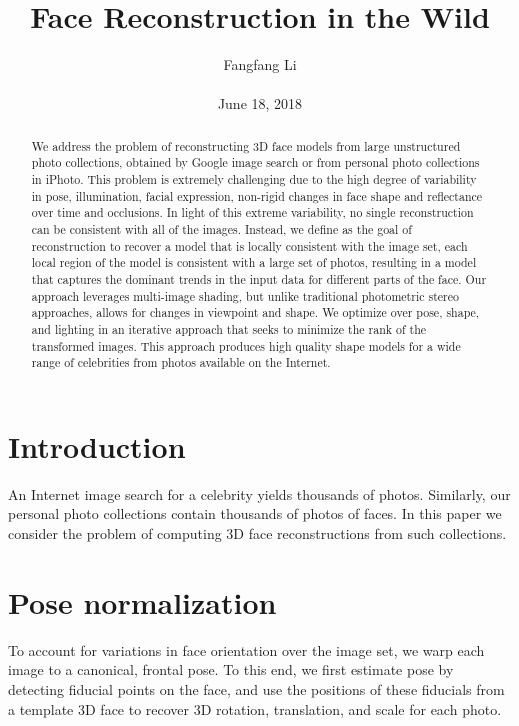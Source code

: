 \documentclass[10pt,twocolumn,letterpaper]{article}
\begin{document}
\title{\textbf{Face Reconstruction in the Wild }}
\author{Fangfang Li\\\\June 18, 2018}
\maketitle
\begin{abstract}
We address the problem of reconstructing 3D face models from large unstructured photo collections, obtained by Google image search or from personal photo collections in iPhoto. This problem is extremely challenging due to the high degree of variability in pose, illumination, facial expression, non-rigid changes in face shape and reflectance over time and occlusions. In light of this extreme variability, no single reconstruction can be consistent with all of the images. Instead, we define as the goal of reconstruction to recover a model that is locally consistent with the image set, each local region  of the model is consistent with a large set of photos, resulting in a model that captures the dominant trends in the input data for different parts of the face. Our approach leverages multi-image shading, but unlike traditional photometric stereo approaches, allows for changes in viewpoint and shape. We optimize over pose, shape, and lighting in an iterative approach that seeks to minimize the rank of the transformed images. This approach produces high quality shape models for a wide range of celebrities from photos available on the Internet.
\end{abstract}
\section{Introduction}
An Internet image search for a celebrity yields thousands of photos. Similarly, our personal photo collections contain thousands of photos of faces. In this paper we consider the problem of computing 3D face reconstructions from such collections.
\section{Pose normalization}
To account for variations in face orientation over the image set, we warp each image to a canonical, frontal pose. To this end, we first estimate pose by detecting fiducial points on the face, and use the positions of these fiducials from a template 3D face to recover 3D rotation, translation, and scale for each photo.
\end{document}

